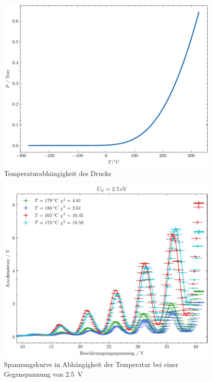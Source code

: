 \begin{figure}[htb]
    \centering
    \includegraphics[width=.5\linewidth]{../figs/druck_temp}
    \caption{Temperaturabhängigkeit des Drucks}
    \label{fig:druck_temp}
\end{figure}


\begin{figure}[htb]
    \centering
    \includegraphics[width=0.6\linewidth]{../figs/franck-hertz_temperatur}
    \caption{Spannungskurve in Abhängigkeit der Temperatur bei einer Gegenspannung von \SI{2.5}{\volt}}
    \label{fig:temperatur}
\end{figure}





